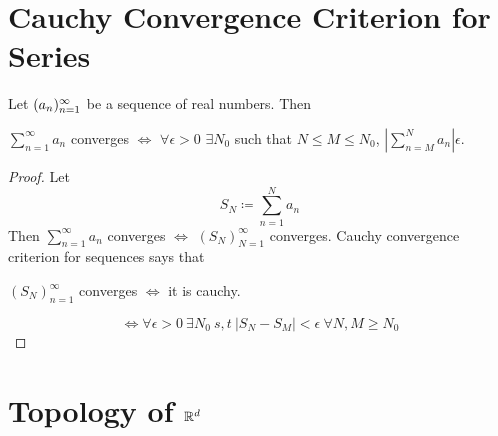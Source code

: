\documentclass[openany]{report}
\begin{document}
\section{Cauchy Convergence Criterion for Series}

\begin{prop}
    Let $({a}_n)_{n=1}^\infty$ be a sequence of real numbers. Then
    \begin{center}
        $\sum_{n=1}^\infty a_n$ converges $\iff$ $\forall \epsilon > 0$ $\exists N_0$ such that $N \leq M \leq N_0$, $|\sum_{n=M}^N a_n| \epsilon$. 
    \end{center}
\end{prop}
\begin{proof}
    Let 
    \[S_N \coloneqq \sum_{n=1}^N a_n\]
    Then $\sum_{n=1}^\infty a_n$ converges $\iff$ $(S_N)_{N=1}^\infty$ converges. Cauchy convergence criterion for sequences says that 
    \begin{center}
        $(S_N)^\infty_{n=1}$ converges $\iff$ it is cauchy.
    \end{center}
    \[\iff \forall \epsilon > 0 \ \exists N_0 \ s,t \ |S_N - S_M| < \epsilon \ \forall N,M \geq N_0\]
\end{proof}

\section{Topology of $\mathbb{R}^d$}
\end{document}
